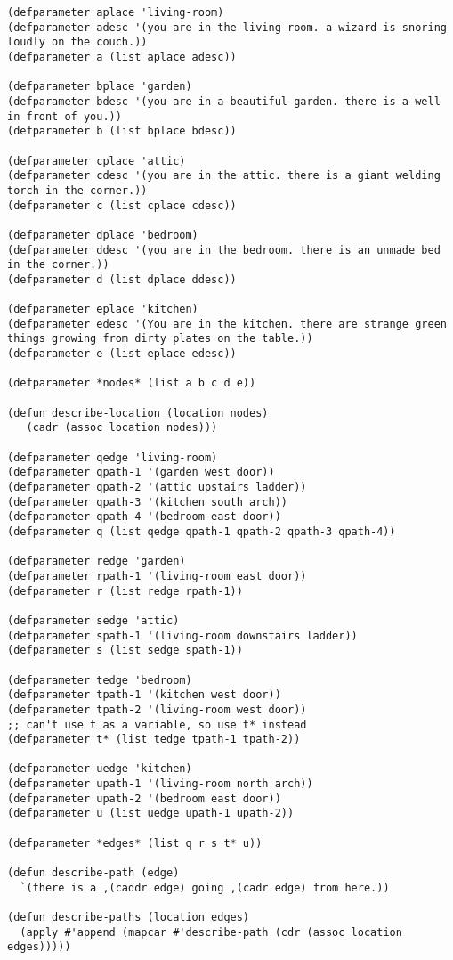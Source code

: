 \documentclass{article}
\begin{document}
\lstset{language=Lisp,numbers=left,keepspaces=false,basicstyle=\small,numberstyle=\tiny,breaklines=true,showstringspaces=false}
\begin{lstlisting}
(defparameter aplace 'living-room)
(defparameter adesc '(you are in the living-room. a wizard is snoring loudly on the couch.))
(defparameter a (list aplace adesc))

(defparameter bplace 'garden)
(defparameter bdesc '(you are in a beautiful garden. there is a well in front of you.))
(defparameter b (list bplace bdesc))

(defparameter cplace 'attic)
(defparameter cdesc '(you are in the attic. there is a giant welding torch in the corner.))
(defparameter c (list cplace cdesc))

(defparameter dplace 'bedroom)
(defparameter ddesc '(you are in the bedroom. there is an unmade bed in the corner.))
(defparameter d (list dplace ddesc))

(defparameter eplace 'kitchen)
(defparameter edesc '(You are in the kitchen. there are strange green things growing from dirty plates on the table.))
(defparameter e (list eplace edesc))

(defparameter *nodes* (list a b c d e))

(defun describe-location (location nodes)
   (cadr (assoc location nodes)))

(defparameter qedge 'living-room)
(defparameter qpath-1 '(garden west door))
(defparameter qpath-2 '(attic upstairs ladder))
(defparameter qpath-3 '(kitchen south arch))
(defparameter qpath-4 '(bedroom east door))
(defparameter q (list qedge qpath-1 qpath-2 qpath-3 qpath-4))

(defparameter redge 'garden)
(defparameter rpath-1 '(living-room east door))
(defparameter r (list redge rpath-1))

(defparameter sedge 'attic)
(defparameter spath-1 '(living-room downstairs ladder))
(defparameter s (list sedge spath-1))

(defparameter tedge 'bedroom)
(defparameter tpath-1 '(kitchen west door))
(defparameter tpath-2 '(living-room west door))
;; can't use t as a variable, so use t* instead
(defparameter t* (list tedge tpath-1 tpath-2))

(defparameter uedge 'kitchen)
(defparameter upath-1 '(living-room north arch))
(defparameter upath-2 '(bedroom east door))
(defparameter u (list uedge upath-1 upath-2))

(defparameter *edges* (list q r s t* u))

(defun describe-path (edge)
  `(there is a ,(caddr edge) going ,(cadr edge) from here.))

(defun describe-paths (location edges)
  (apply #'append (mapcar #'describe-path (cdr (assoc location edges)))))
\end{lstlisting}
\end{document}
